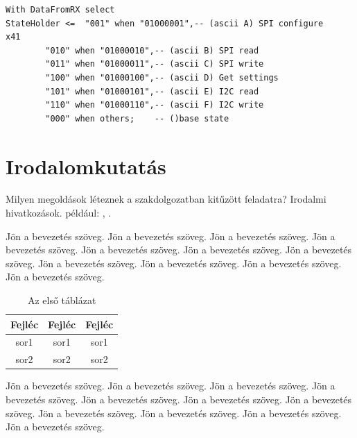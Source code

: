 \documentclass[a4paper,12pt,oneside]{book}
\begin{document}
\begin{lstlisting}
With DataFromRX select
StateHolder <= 	"001" when "01000001",-- (ascii A) SPI configure	x41 
		"010" when "01000010",-- (ascii B) SPI read
		"011" when "01000011",-- (ascii C) SPI write
		"100" when "01000100",-- (ascii D) Get settings
		"101" when "01000101",-- (ascii E) I2C read
		"110" when "01000110",-- (ascii F) I2C write
		"000" when others;    -- ()base state
	\end{lstlisting}






\iffalse
\chapter{Irodalomkutatás}
Milyen megoldások léteznek a szakdolgozatban kitűzött feladatra? Irodalmi hivatkozások. például: \cite{b1}, \cite{htm}.


Jön a bevezetés szöveg. Jön a bevezetés szöveg. Jön a bevezetés szöveg. Jön a bevezetés szöveg. Jön a bevezetés szöveg. Jön a bevezetés szöveg. Jön a bevezetés szöveg. Jön a bevezetés szöveg. Jön a bevezetés szöveg. Jön a bevezetés szöveg. Jön a bevezetés szöveg.

\begin{table}[H]
	\centering \renewcommand{\arraystretch}{1.2}
	\caption{Az első táblázat}
	\begin{tabular}{|c|c|c|} \hline
		Fejléc&Fejléc&Fejléc\\ \hline
		sor1&sor1&sor1\\ \hline
		sor2&sor2&sor2\\ \hline	
	\end{tabular}
	\label{tabla1}
\end{table}

Jön a bevezetés szöveg. Jön a bevezetés szöveg. Jön a bevezetés szöveg. Jön a bevezetés szöveg. Jön a bevezetés szöveg. Jön a bevezetés szöveg. Jön a bevezetés szöveg. Jön a bevezetés szöveg. Jön a bevezetés szöveg. Jön a bevezetés szöveg. Jön a bevezetés szöveg.
\end{document}
